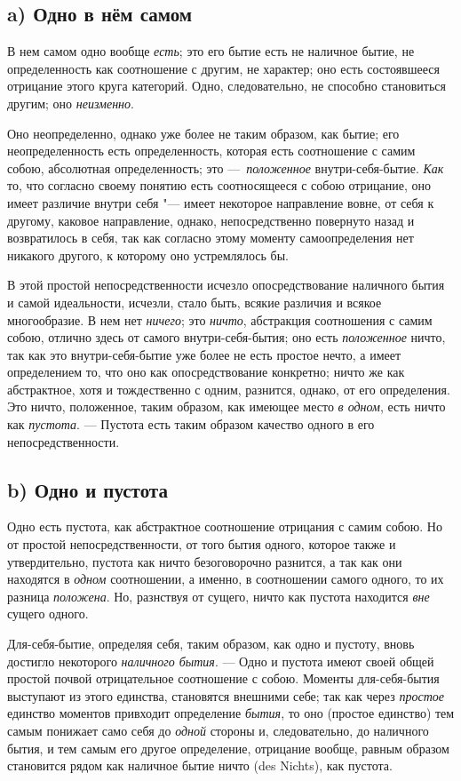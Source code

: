 \subsection*{a) Одно в нём самом}
В нем самом одно вообще {\em есть}; это его бытие есть
не наличное бытие, не определенность как соотношение с другим, не характер;
оно есть состоявшееся отрицание этого круга категорий. Одно, следовательно,
не способно становиться другим; оно {\em неизменно}.

Оно неопределенно, однако уже более не таким образом, как бытие; его
неопределенность есть определенность, которая есть соотношение с самим
собою, абсолютная определенность; это
—~{\em положенное} внутри-себя-бытие.
{\em Как} то, что согласно своему понятию есть
соотносящееся с собою отрицание, оно имеет различие внутри себя "--- имеет
некоторое направление вовне, от себя к другому, каковое направление,
однако, непосредственно повернуто назад и возвратилось в себя, так как
согласно этому моменту самоопределения нет никакого другого, к которому оно
устремлялось бы.

В этой простой непосредственности исчезло опосредствование наличного бытия и
самой идеальности, исчезли, стало быть, всякие различия и всякое
многообразие. В нем нет {\em ничего}; это
{\em ничто}, абстракция соотношения с самим собою,
отлично здесь от самого внутри-себя-бытия; оно есть
{\em положенное} ничто, так как это внутри-себя-бытие
уже более не есть простое нечто, а имеет определением то, что оно как
опосредствование конкретно; ничто же как абстрактное, хотя и тождественно с
одним, разнится, однако, от его определения. Это ничто, положенное, таким
образом, как имеющее место {\em в одном}, есть ничто
как {\em пустота}. — Пустота есть таким образом
качество одного в его непосредственности.

\subsection*{b) Одно и пустота}
Одно есть пустота, как абстрактное соотношение отрицания с самим собою. Но
от простой непосредственности, от того бытия одного, которое также и
утвердительно, пустота как ничто безоговорочно разнится, а так как они
находятся в {\em одном} соотношении, а именно, в
соотношении самого одного, то их разница
{\em положена}. Но, разнствуя от сущего, ничто как
пустота находится {\em вне} сущего одного.

Для-себя-бытие, определяя себя, таким образом, как одно и пустоту, вновь
достигло некоторого {\em наличного бытия}. — Одно и
пустота имеют своей общей простой почвой отрицательное соотношение с собою.
Моменты для-себя-бытия выступают из этого единства, становятся внешними
себе; так как через {\em простое} единство моментов
привходит определение {\em бытия}, то оно (простое
единство) тем самым понижает само себя до {\em одной}
стороны и, следовательно, до наличного бытия, и тем самым его другое
определение, отрицание вообще, равным образом становится рядом как наличное
бытие ничто (des Nichts), как пустота.

